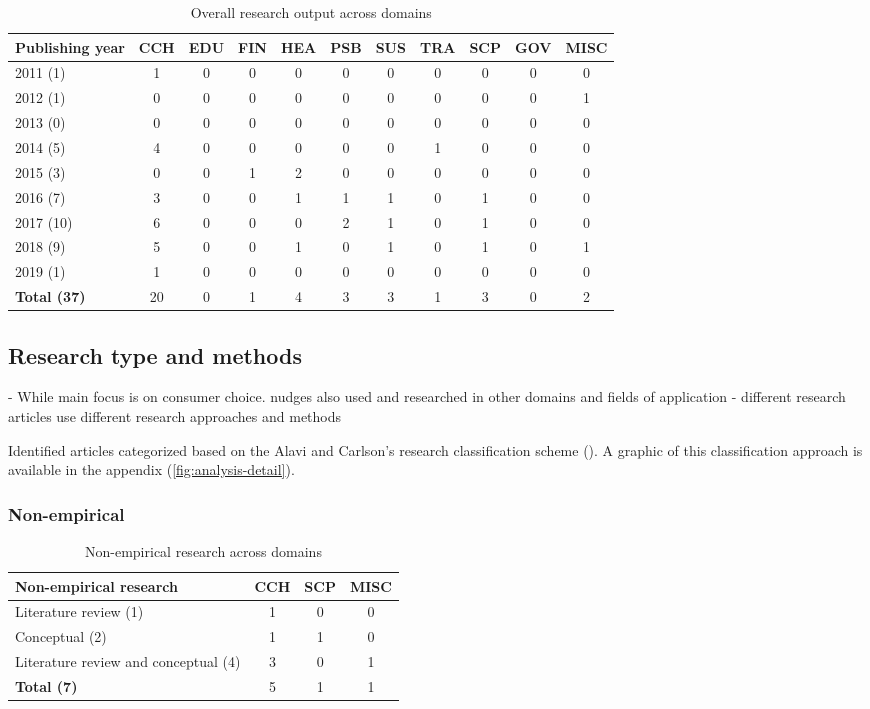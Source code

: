 \begin{table}[htbp]
\centering
\small
\begin{tabular}{l|cccccccccc}
\textbf{Publishing year} & \textbf{CCH} & \textbf{EDU} & \textbf{FIN} & \textbf{HEA} & \textbf{PSB} & \textbf{SUS} & \textbf{TRA} & \textbf{SCP} & \textbf{GOV} & \textbf{MISC} \\ \hline
2011 (1) & 1 & 0 & 0 & 0 & 0 & 0 & 0 & 0 & 0 &  0 \\
2012 (1) & 0 & 0 & 0 & 0 & 0 & 0 & 0 & 0 & 0 & 1 \\
2013 (0) & 0 & 0 & 0 & 0 & 0 & 0 & 0 & 0 & 0 & 0 \\
2014 (5) & 4 & 0 & 0 & 0 & 0 & 0 & 1 & 0 & 0 & 0 \\
2015 (3) & 0 & 0 & 1 & 2 & 0 & 0 & 0 & 0 & 0 & 0 \\
2016 (7) & 3 & 0 & 0 & 1 & 1 & 1 & 0 & 1 & 0 & 0 \\
2017 (10) & 6 & 0 & 0 & 0 & 2 & 1 & 0 & 1 & 0 & 0 \\
2018 (9) & 5 & 0 & 0 & 1 & 0 & 1 & 0 & 1 & 0 & 1 \\
2019 (1) & 1 & 0 & 0 & 0 & 0 & 0 & 0 & 0 & 0 & 0 \\ \hline
\textbf{Total (37)} & 20 & 0 & 1 & 4 & 3 & 3 & 1 & 3 & 0 & 2
\end{tabular}
\caption{Overall research output across domains}
\label{table:research-output}
\end{table}


\subsection{Research type and methods}
- While main focus is on consumer choice. nudges also used and researched in other domains and fields of application
- different research articles use different research approaches and methods

Identified articles categorized based on the Alavi and Carlson's research classification scheme (\cite{alavi_review_1992}). A graphic of this classification approach is available in the appendix (\ref{fig:analysis-detail}).


\subsubsection{Non-empirical}
\begin{table}[htbp]
\centering
\begin{tabular}{l|ccc}
\textbf{Non-empirical research} & \textbf{CCH} & \textbf{SCP} & \textbf{MISC} \\ \hline
Literature review (1) & 1 & 0 & 0 \\
Conceptual (2) & 1 & 1 & 0 \\
Literature review and conceptual (4) & 3 & 0 & 1 \\ \hline
\textbf{Total (7)} & 5 & 1 & 1
\end{tabular}
\caption{Non-empirical research across domains}
\label{table:non-empirical}
\end{table}


